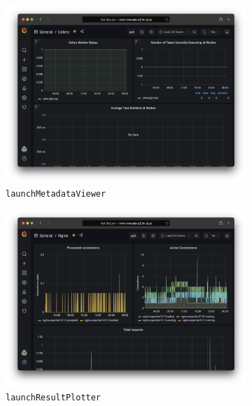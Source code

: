 \begin{figure}[!h]
\begin{subfigure}[h]{0.3\textwidth}
		\includegraphics[width=\textwidth]{images/app-server/grafana-celery}
		\caption{\footnotesize{\texttt{launchMetadataViewer}}}
	\end{subfigure}
	\begin{subfigure}[h]{0.45\textwidth}
		\includegraphics[width=\textwidth]{images/app-server/grafana-nginx}
		\caption{\footnotesize{\texttt{launchResultPlotter}}}
	\end{subfigure}
	\begin{subfigure}[h]{0.45\textwidth}

\end{subfigure}
\end{figure}
